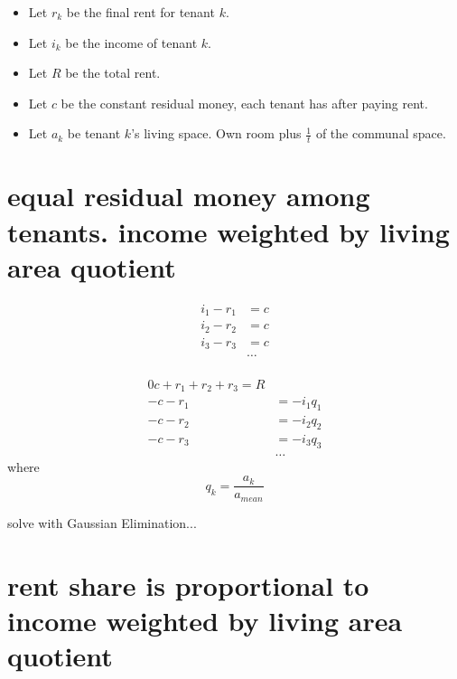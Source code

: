 \documentclass[11pt]{article}
\begin{document}
    \begin{itemize}
        \item
        Let $r_k$ be the final rent for tenant $k$.
        \item
        Let $i_k$ be the income of tenant $k$.
        \item
        Let $R$ be the total rent.
        \item
        Let $c$ be the constant residual money, each tenant has after paying rent.
        \item
        Let $a_k$ be tenant $k$'s living space. Own room plus $\frac{1}{t}$ of the communal space.
    \end{itemize}


    \section{equal residual money among tenants. income weighted by living area quotient}
    \begin{align}
        i_1 - r_1 &= c \\
        i_2 - r_2 &= c \\
        i_3 - r_3 &= c\\
        &\ldots
    \end{align}\\
    \newline
    \begin{align}
        0 c + r_1 + r_2 + r_3 = R\\
        -c - r_1 &= -i_1 q_1 \\
        -c - r_2 &= -i_2 q_2 \\
        -c - r_3 &= -i_3 q_3 \\
        &\ldots
    \end{align}
    \newline
    where
    \begin{equation}
        q_k = \frac{a_k}{a_{mean}}
    \end{equation}
    \newline

    \newline \newline
    solve with Gaussian Elimination...


    \section{rent share is proportional to income weighted by living area quotient}
\end{document}
